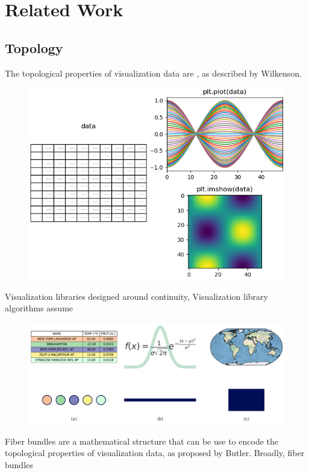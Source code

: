 \documentclass[10pt,journal,compsoc]{IEEEtran}
\theoremstyle{definition}
\theoremstyle{remark}
\begin{document}

\section{Related Work}

\subsection{Topology}
The topological properties of visualization data are , as described by Wilkenson\cite{wilkinsonGrammarGraphics2005}. 

\begin{figure}[h!]
  \includegraphics[width=1\columnwidth]{continuity.png}
\end{figure}
Visualization libraries designed around continuity,  
Visualization library algorithms assume 

\begin{figure}[h!]
  \includegraphics[width=1\columnwidth]{k_different_types.png}
\end{figure}
Fiber bundles are a mathematical structure that can be use to encode the topological properties of visualization data, as proposed by Butler\cite{butlerVectorBundleClassesForm1992,butlerVisualizationModelBased1989}. Broadly, fiber bundles
\end{document}
